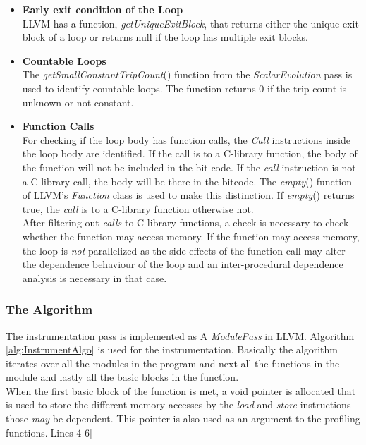 \documentclass[10pt]{report}          %
\begin{document}
\begin{itemize}

\item \textbf{Early exit condition of the Loop}\\
LLVM has a function, {\em getUniqueExitBlock}, that returns either the unique exit block of a loop or returns null if the loop has multiple exit blocks.

\item \textbf{Countable Loops}\\
The \textit{getSmallConstantTripCount}() function from the \textit{ScalarEvolution} pass is used to identify countable loops.  The function returns 0 if the trip count is unknown or not constant.

\item \textbf{Function Calls}\\
For checking if the loop body has function calls, the \textit{Call} instructions inside the loop body are identified.  If the call is to a C-library function, the body of the function will not be included in the bit code.  If the \textit{call} instruction is not a C-library call, the body will be there in the bitcode.  The \textit{empty}() function of LLVM's \textit{Function} class is used to make this distinction. If \textit{empty}() returns true, the \textit{call} is to a C-library function otherwise not.\\
After filtering out \textit{calls} to C-library functions, a check is necessary to check whether the function may access memory.  If the function may access memory, the loop is \textit{not} parallelized as the side effects of the function call may alter the dependence behaviour of the loop and an inter-procedural dependence analysis is necessary in that case.


\end{itemize}

\subsubsection{The Algorithm}

The instrumentation pass is implemented as A \textit{ModulePass} in LLVM.  Algorithm \ref{alg:InstrumentAlgo} is used for the instrumentation.  Basically the algorithm iterates over all the modules in the program and next all the functions in the module and lastly all the basic blocks in the function. \\

When the first basic block of the function is met, a void pointer is allocated that is used to store the different memory accesses by the \textit{load} and \textit{store} instructions those \textit{may} be dependent. This pointer is also used as an argument to the profiling functions.[Lines 4-6] \\
\end{document}
